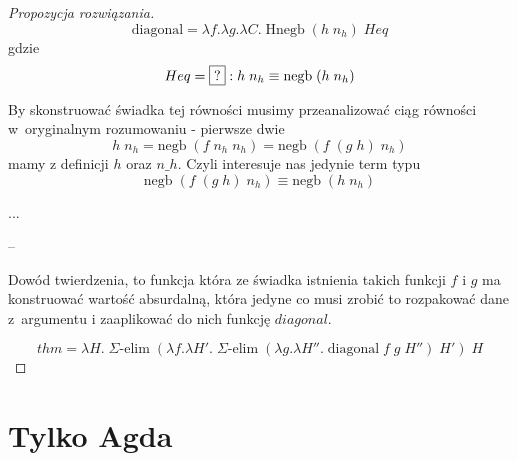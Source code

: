 \documentclass[11pt, a4paper]{article}
\begin{document}
\begin{proof}[Propozycja rozwiązania]
\[
  \mbox{diagonal} = \lambda f.\lambda g. \lambda C.\; \mbox{Hnegb}\; (h\;n_h)\; Heq
\]
gdzie
\[
 Heq = \framebox{?} : h\;n_h \equiv \mbox{negb}\; (h\;n_h)
\]

By skonstruować świadka tej równości musimy przeanalizować ciąg równości w~oryginalnym rozumowaniu - pierwsze dwie
\[
h\;n_h = \mbox{negb}\;(f\;n_h\;n_h) = \mbox{negb}\;(f\;(g\;h)\;n_h)
\]
mamy z definicji $h$ oraz $n\_h$. Czyli interesuje nas jedynie term typu
\[
\mbox{negb}\;(f\;(g\;h)\;n_h) \equiv \mbox{negb}\; (h\;n_h)
\]

...

--

Dowód twierdzenia, to funkcja która ze świadka istnienia takich funkcji $f$ i $g$ ma konstruować wartość absurdalną, która
jedyne co musi zrobić to rozpakować dane z~argumentu i zaaplikować do nich funkcję $diagonal$. 

\[
thm = 
 \lambda H.\;
 \Sigma\mbox{-elim}\;
(\lambda f. \lambda H'.\; \Sigma\mbox{-elim}\; (\lambda g. \lambda H''.\;
\mbox{diagonal}\;f\;g\;H''
)\;
H')\;H
\]

\end{proof}

\section{Tylko Agda}
\end{document}
